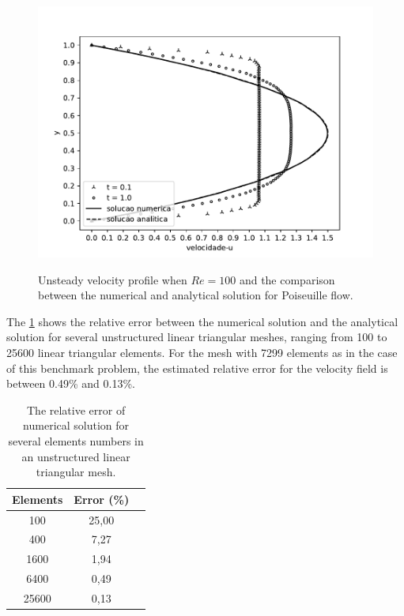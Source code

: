 \begin{figure}[H]
     \centering
     \includegraphics[scale=1]{./02_chaps/cap_validation/figure/poiseuille_velocity.pdf}\\
     \medskip
     \caption{
Unsteady velocity profile when $Re=100$ and the comparison between
the numerical and analytical solution for Poiseuille flow.} 
     \label{velocidade poiseuille}
\end{figure}

\newpage
The \ref{erro relativo poiseuille tabela} shows the relative error 
between the numerical solution and the analytical solution 
for several unstructured linear triangular meshes, ranging 
from 100 to 25600 linear triangular elements. For the mesh 
with 7299 elements as in the case of this benchmark problem, 
the estimated relative error for the velocity field is between 
0.49\% and 0.13\%.

\vspace{0.5cm}
\begin{table}[H]
\centering
\begin{tabular}{ccc}
\toprule
\textbf{Elements} & \textbf{Error} (\%) \\
\midrule
100 & 25,00 \\
400 & 7,27 \\
1600 & 1,94 \\
6400 & 0,49 \\
25600 & 0,13 \\
\bottomrule
\end{tabular}
\caption{The relative error of numerical solution for several elements numbers in an unstructured linear triangular mesh.}
\label{erro relativo poiseuille tabela}
\end{table}

